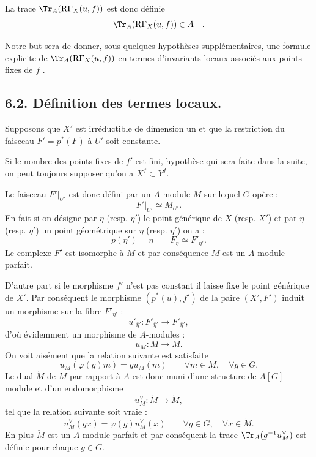 La trace $\Tr_A(\mathrm{R}\Gamma_X(u, f))$ est donc définie
\[
\Tr_A(\mathrm{R}\Gamma_X(u, f)) \in A \quad .
\]

Notre but sera de donner, sous quelques hypothèses supplémentaires, une formule explicite de $\Tr_A(\mathrm{R}\Gamma_X(u, f))$ en termes d'invariants locaux associés aux points fixes de $f$ .

\bigskip

\subsection*{6.2. Définition des termes locaux.}
Supposons que $X'$ est irréductible de dimension un et que la restriction du faisceau $F'=p^*(F)$ à $U'$ soit constante.

Si le nombre des points fixes de $f'$ est fini, hypothèse qui sera faite dans la suite, on peut toujours supposer qu'on a $X^f \subset Y^f$.

Le faisceau $F'|_{U'}$ est donc défini par un $A$-module $M$ sur lequel $G$ opère :
\[
F'|_{U'} \simeq M_{U'} .
\]
En fait si on désigne par $\eta$ (resp. $\eta'$) le point générique de $X$ (resp. $X'$) et par $\bar\eta$ (resp. $\bar\eta'$) un point géométrique sur $\eta$ (resp. $\eta'$) on a :
\[
p(\eta')=\eta\qquad F_{\bar\eta} \simeq F'_{\bar\eta'} .
\]
Le complexe $F'$ est isomorphe à $M$ et par conséquence $M$ est un $A$-module parfait.

D'autre part si le morphisme $f'$ n'est pas constant il laisse fixe le point générique de $X'$. Par conséquent le morphisme $(p^*(u),f')$ de la paire $(X',F')$ induit un morphisme sur la fibre $F'_{\bar\eta'}$ :
\[
u'_{\bar\eta'}:F'_{\bar\eta'}\longrightarrow F'_{\bar\eta'} ,
\]
d'où évidemment un morphisme de $A$-modules :
\[
u_M:M\longrightarrow M .
\]
On
voit aisément que la relation suivante est satisfaite
\begin{equation}\tag{6.2.1}
u_M(\varphi(g)m)=g u_M(m) \qquad \forall m\in M,\quad \forall g\in G .
\end{equation}
Le dual $\check{M}$ de $M$ par rapport à $A$ est donc muni d'une structure de $A[G]$-module et d'un endomorphisme
\[
u_M^\vee:\check{M}\longrightarrow \check{M} ,
\]
tel que la relation suivante soit vraie :
\[
u_M^\vee(gx)=\varphi(g)u_M^\vee(x) \qquad \forall g\in G,\quad \forall x\in \check{M} .
\]
En plus $\check{M}$ est un $A$-module parfait et par conséquent la trace $\Tr_A(g^{-1}u_M^\vee)$ est définie pour chaque $g\in G$.

